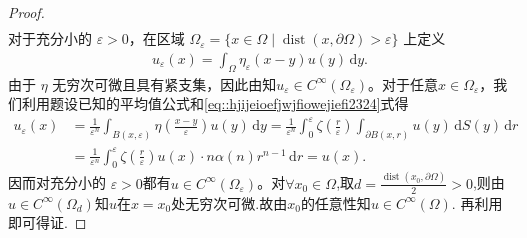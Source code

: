\documentclass[../../main.tex]{subfiles}%
\begin{document}
\begin{proof}
\begin{align}
\end{align}
对于充分小的 $\varepsilon>0$，在区域 $\Omega_\varepsilon = \{x\in\Omega \mid \operatorname{dist}(x,\partial\Omega)>\varepsilon\}$ 上定义
\begin{align*}
u_\varepsilon(x) = \int_\Omega \eta_\varepsilon(x-y)u(y)\,\mathrm{d}y.
\end{align*}
由于 $\eta$ 无穷次可微且具有紧支集，因此由知$u_\varepsilon\in C^\infty(\Omega_\varepsilon)$。对于任意$x\in\Omega_\varepsilon$，我们利用题设已知的平均值公式和\eqref{eq::hjijeioefjwjfiowejiefi2324}式得
\begin{align*}
u_\varepsilon(x) &= \frac{1}{\varepsilon^n}\int_{B(x,\varepsilon)} \eta\left(\frac{x-y}{\varepsilon}\right)u(y)\,\mathrm{d}y = \frac{1}{\varepsilon^n}\int_0^\varepsilon \zeta\left(\frac{r}{\varepsilon}\right) \int_{\partial B(x,r)} u(y)\,\mathrm{d}S(y)\,\mathrm{d}r \\
&= \frac{1}{\varepsilon^n}\int_0^\varepsilon \zeta\left(\frac{r}{\varepsilon}\right) u(x)\cdot n\alpha(n)r^{n-1}\,\mathrm{d}r 
= u(x).
\end{align*}
因而对充分小的 $\varepsilon>0$都有$u\in C^\infty(\Omega_\varepsilon)$。对$\forall x_0\in \Omega$,取$d = \frac{\operatorname{dist}(x_0,\partial\Omega)}{2}>0$,则由$u\in C^{\infty}(\Omega_d)$知$u$在$x = x_0$处无穷次可微.故由$x_0$的任意性知$u\in C^\infty(\Omega)$.
再利用即可得证.
\end{proof}
\end{document}
